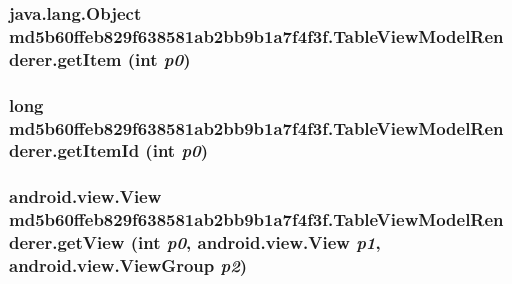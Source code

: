 \hypertarget{classmd5b60ffeb829f638581ab2bb9b1a7f4f3f_1_1_table_view_model_renderer_29fccc826a353ce09af883f666114b60}{
\subsubsection[{getItem}]{\setlength{\rightskip}{0pt plus 5cm}java.lang.Object md5b60ffeb829f638581ab2bb9b1a7f4f3f.TableViewModelRenderer.getItem (int {\em p0})}}
\label{classmd5b60ffeb829f638581ab2bb9b1a7f4f3f_1_1_table_view_model_renderer_29fccc826a353ce09af883f666114b60}


\hypertarget{classmd5b60ffeb829f638581ab2bb9b1a7f4f3f_1_1_table_view_model_renderer_b9aaff4a338f4d59482b230ef3a05bcb}{
\subsubsection[{getItemId}]{\setlength{\rightskip}{0pt plus 5cm}long md5b60ffeb829f638581ab2bb9b1a7f4f3f.TableViewModelRenderer.getItemId (int {\em p0})}}
\label{classmd5b60ffeb829f638581ab2bb9b1a7f4f3f_1_1_table_view_model_renderer_b9aaff4a338f4d59482b230ef3a05bcb}


\hypertarget{classmd5b60ffeb829f638581ab2bb9b1a7f4f3f_1_1_table_view_model_renderer_57aa1ff548af7c33edb21978ce2bc22c}{
\subsubsection[{getView}]{\setlength{\rightskip}{0pt plus 5cm}android.view.View md5b60ffeb829f638581ab2bb9b1a7f4f3f.TableViewModelRenderer.getView (int {\em p0}, \/  android.view.View {\em p1}, \/  android.view.ViewGroup {\em p2})}}
\label{classmd5b60ffeb829f638581ab2bb9b1a7f4f3f_1_1_table_view_model_renderer_57aa1ff548af7c33edb21978ce2bc22c}


